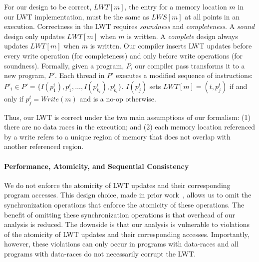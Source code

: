 \documentclass[preprint,9pt]{sigplanconf}
\newcommand{\lwt}{LWT\xspace}
\begin{document}
For our design to be correct, $LWT[m]$, the entry for a memory location $m$ in
our \lwt implementation, must be the same as $LWS[m]$ at all points in an
execution.  Correctness in the \lwt requires {\em soundness} and {\em
completeness}.  A {\em sound} design only updates $LWT[m]$ when $m$ is
written.  A {\em complete} design always updates $LWT[m]$ when $m$ is written.
Our compiler inserts \lwt updates before every write
operation (for completeness) and only before write operations (for soundness).
Formally, given a program, $P$, our compiler pass transforms it to a new
program, $P'$.  Each thread in $P'$ executes a modified sequence of
instructions: $P'_{i} \in P' = \{ I(p^{i}_{1}), p^{i}_{1}, \ldots,
I(p^{i}_{k_{i}}), p^{i}_{k_{i}} \}$.  $I(p^{t}_{j})$ sets $LWT[m] =
(t,p^{t}_{j})$ if and only if $p^{t}_{j} = Write(m)$ and is a no-op otherwise.

Thus, our \lwt is correct under the two main assumptions of our formalism: (1)
there are no data races in the execution; and (2) each memory location
referenced by a write refers to a unique region of memory that does not overlap
with another referenced region.  

\paragraph{Performance, Atomicity, and Sequential Consistency}

We do not enforce the atomicity of \lwt updates and their corresponding program
accesses.  This design choice, made in prior work~\cite{fasttrack,recon},
allows us to omit the synchronization operations that enforce the atomicity of
these operations.  The benefit of omitting these synchronization operations is
that overhead of our analysis is reduced. The downside is that our analysis is
vulnerable to violations of the atomicity of \lwt updates and their
corresponding accesses. Importantly, however, these violations can only occur
in programs with data-races and all programs with data-races do not necessarily
corrupt the \lwt. 
\end{document}
